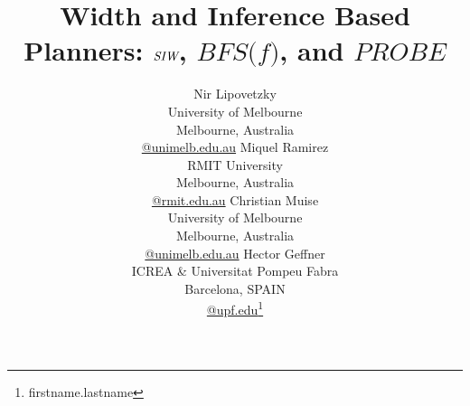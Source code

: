 \documentclass[letterpaper]{article}
\begin{document}
\title{Width and Inference Based Planners: $\SR$, $\textit{BFS(f)}$, and $\textit{PROBE}$}


\author{Nir Lipovetzky \\
      University of Melbourne \\
   Melbourne, Australia\\ 
   {\normalsize\url{@unimelb.edu.au}}
   \And
   Miquel Ramirez \\
   RMIT University \\
   Melbourne, Australia\\ 
   {\normalsize\url{@rmit.edu.au}}
   \And
   Christian Muise \\
   University of Melbourne \\
   Melbourne, Australia\\ 
   {\normalsize\url{@unimelb.edu.au}}
   \And
        Hector Geffner \\
        ICREA \&  Universitat Pompeu Fabra \\
        Barcelona, SPAIN \\
        {\normalsize\url{@upf.edu}}\thanks{firstname.lastname}
}




\newcommand{\tuple}[1]{{\langle #1\rangle}}
\newcommand{\triple}[1]{{\langle #1\rangle}}
\newcommand{\pair}[1]{{\langle #1\rangle}}

\newcommand{\Omit}[1]{}

\newcommand{\OmitEcai}[1]{}

\newcommand{\eqdef}{\stackrel{\hbox{\tiny{def}}}{=}}
\newcommand{\IR}{{\textit{IW}}}
\newcommand{\SR}{{\textit{SIW}}}
\newcommand{\ID}{{\textit{ID}}}

\newcommand{\BRFS}{{\textit{BrFS}}}

 \newtheorem{theorem}{Theorem}


\newtheorem{proposition}[theorem]{Proposition}
\newtheorem{lemma}[theorem]{Lemma}
\newtheorem{corollary}[theorem]{Corollary}
\newtheorem{definition}[theorem]{Definition}



\maketitle
\end{document}

